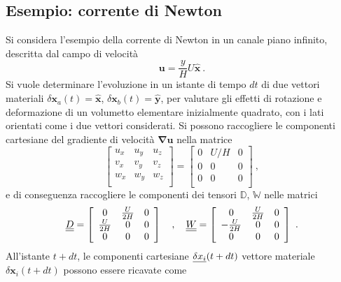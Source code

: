 \subsection{Esempio: corrente di Newton}
Si considera l'esempio della corrente di Newton in un canale piano infinito, descritta dal campo di velocità 
\begin{equation}
  \bm{u} = \frac{y}{H}U \bm{\hat{x}} \ .
\end{equation}
Si vuole determinare l'evoluzione in un istante di tempo $dt$ di due vettori materiali $\delta \bm{x}_a(t) = \bm{\hat{x}}$, $\delta \bm{x}_b(t) = \bm{\hat{y}}$, per valutare gli effetti di rotazione e deformazione di un volumetto elementare inizialmente quadrato, con i lati orientati come i due vettori considerati.
Si possono raccogliere le componenti cartesiane del gradiente di velocità $\bm{\nabla} \bm{u}$ nella matrice
\begin{equation}
 \left[
 \begin{array}{ccc} 
   u_x & u_y & u_z \\
   v_x & v_y & v_z \\
   w_x & w_y & w_z \\
 \end{array} \right] = 
 \left[
 \begin{array}{ccc} 
   0 & U/H & 0 \\
   0 &  0  & 0 \\
   0 &  0  & 0 \\
 \end{array} \right] \ ,
\end{equation}
e di conseguenza raccogliere le componenti dei tensori $\mathbb{D}$, $\mathbb{W}$ nelle matrici
\begin{equation}
 \underline{\underline{D}} = 
 \left[
 \begin{array}{ccc} 
   0 & \frac{U}{2H} & 0 \\
   \frac{U}{2H} & 0 & 0 \\
   0 &  0  & 0 \\
 \end{array} \right] \quad , \quad
 \underline{\underline{W}} = 
 \left[
 \begin{array}{ccc} 
   0 & \frac{U}{2H} & 0 \\
  -\frac{U}{2H} & 0 & 0 \\
   0 &  0  & 0 \\
 \end{array} \right] \ .
\end{equation}
All'istante $t+dt$, le componenti cartesiane $\underline{\delta x_i}(t+dt)$ vettore materiale $\delta \bm{x}_i(t+dt)$ possono essere ricavate come
